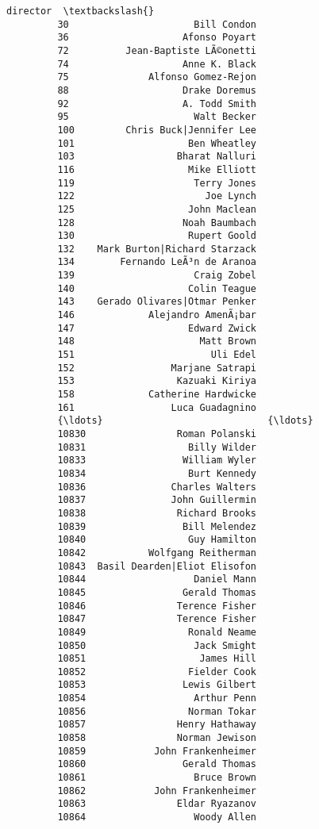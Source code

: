 \documentclass[11pt]{article}
\begin{document}
\begin{Verbatim}[commandchars=\\\{\}]
                                    director  \textbackslash{}
         30                      Bill Condon   
         36                    Afonso Poyart   
         72          Jean-Baptiste LÃ©onetti   
         74                    Anne K. Black   
         75              Alfonso Gomez-Rejon   
         88                    Drake Doremus   
         92                    A. Todd Smith   
         95                      Walt Becker   
         100         Chris Buck|Jennifer Lee   
         101                    Ben Wheatley   
         103                  Bharat Nalluri   
         116                    Mike Elliott   
         119                     Terry Jones   
         122                       Joe Lynch   
         125                    John Maclean   
         128                   Noah Baumbach   
         130                    Rupert Goold   
         132    Mark Burton|Richard Starzack   
         134        Fernando LeÃ³n de Aranoa   
         139                     Craig Zobel   
         140                    Colin Teague   
         143    Gerado Olivares|Otmar Penker   
         146             Alejandro AmenÃ¡bar   
         147                    Edward Zwick   
         148                      Matt Brown   
         151                        Uli Edel   
         152                 Marjane Satrapi   
         153                  Kazuaki Kiriya   
         158             Catherine Hardwicke   
         161                 Luca Guadagnino   
         {\ldots}                             {\ldots}   
         10830                Roman Polanski   
         10831                  Billy Wilder   
         10833                 William Wyler   
         10834                  Burt Kennedy   
         10836               Charles Walters   
         10837               John Guillermin   
         10838                Richard Brooks   
         10839                 Bill Melendez   
         10840                  Guy Hamilton   
         10842           Wolfgang Reitherman   
         10843  Basil Dearden|Eliot Elisofon   
         10844                   Daniel Mann   
         10845                 Gerald Thomas   
         10846                Terence Fisher   
         10847                Terence Fisher   
         10849                  Ronald Neame   
         10850                   Jack Smight   
         10851                    James Hill   
         10852                  Fielder Cook   
         10853                 Lewis Gilbert   
         10854                   Arthur Penn   
         10856                  Norman Tokar   
         10857                Henry Hathaway   
         10858                Norman Jewison   
         10859            John Frankenheimer   
         10860                 Gerald Thomas   
         10861                   Bruce Brown   
         10862            John Frankenheimer   
         10863                Eldar Ryazanov   
         10864                   Woody Allen   
         

\end{Verbatim}
\end{document}
